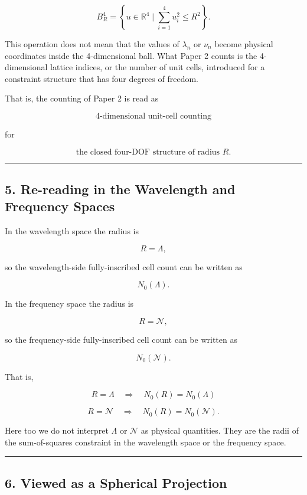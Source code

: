 \documentclass[
]{article}
\begin{document}
\[
B^4_R
=
\left\{
u\in\mathbb{R}^4
\mid
\sum_{i=1}^{4}u_i^2\le R^2
\right\} .
\]

This operation does not mean that the values of \(\lambda_n\) or
\(\nu_n\) become physical coordinates inside the 4-dimensional ball.
What Paper 2 counts is the 4-dimensional lattice indices, or the number
of unit cells, introduced for a constraint structure that has four
degrees of freedom.

That is, the counting of Paper 2 is read as

\[
\text{4-dimensional unit-cell counting}
\]

for

\[
\text{the closed four-DOF structure of radius }R .
\]

\begin{center}\rule{0.5\linewidth}{0.5pt}\end{center}

\subsection{5. Re-reading in the Wavelength and Frequency
Spaces}\label{re-reading-in-the-wavelength-and-frequency-spaces}

In the wavelength space the radius is

\[
R=\Lambda ,
\]

so the wavelength-side fully-inscribed cell count can be written as

\[
N_0(\Lambda) .
\]

In the frequency space the radius is

\[
R=\mathcal{N} ,
\]

so the frequency-side fully-inscribed cell count can be written as

\[
N_0(\mathcal{N}) .
\]

That is,

\[
R=\Lambda
\quad\Rightarrow\quad
N_0(R)=N_0(\Lambda)
\]

\[
R=\mathcal{N}
\quad\Rightarrow\quad
N_0(R)=N_0(\mathcal{N}) .
\]

Here too we do not interpret \(\Lambda\) or \(\mathcal{N}\) as physical
quantities. They are the radii of the sum-of-squares constraint in the
wavelength space or the frequency space.

\begin{center}\rule{0.5\linewidth}{0.5pt}\end{center}

\subsection{6. Viewed as a Spherical
Projection}\label{viewed-as-a-spherical-projection}
\end{document}
